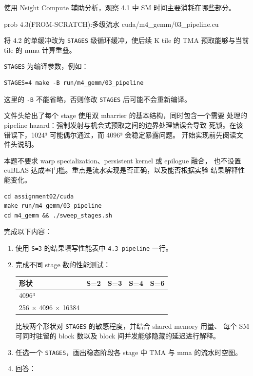 \documentclass[11pt,a4paper,fontset=none]{ctexart}
\providecommand{\passthrough}[1]{#1}
\begin{document}
使用 Nsight Compute 辅助分析，观察 4.1 中 SM 时间主要消耗在哪些部分。

\begin{capstone}{prob 4.3(FROM-SCRATCH):多级流水 \hfill {\footnotesize\ttfamily cuda/m4\_gemm/03\_pipeline.cu}}

将 4.2 的单缓冲改为 \passthrough{\lstinline!STAGES!} 级循环缓冲，使后续
K tile 的 TMA 预取能够与当前 tile 的 mma 计算重叠。

\passthrough{\lstinline!STAGES!} 为编译参数，例如：

\begin{lstlisting}
STAGES=4 make -B run/m4_gemm/03_pipeline
\end{lstlisting}

这里的 \passthrough{\lstinline!-B!} 不能省略，否则修改
\passthrough{\lstinline!STAGES!} 后可能不会重新编译。

文件头给出了每个 stage 使用双 mbarrier 的基本结构，同时包含一个需要
处理的 pipeline hazard：强制发射与机会式预取之间的边界处理错误会导致
死锁。在该错误下，1024³ 可能偶尔通过，而 4096³ 会稳定暴露问题。
开始实现前先阅读文件头说明。

本题不要求 warp specialization、persistent kernel 或 epilogue 融合，
也不设置 cuBLAS 达成率门槛。重点是流水实现是否正确，以及能否根据实验
结果解释性能变化。

\begin{lstlisting}
cd assignment02/cuda
make run/m4_gemm/03_pipeline
cd m4_gemm && ./sweep_stages.sh
\end{lstlisting}

完成以下内容：

\begin{enumerate}
\def\labelenumi{\arabic{enumi}.}
\item
  使用 \passthrough{\lstinline!S=3!} 的结果填写性能表中
  \passthrough{\lstinline!4.3 pipeline!} 一行。
\item
  完成不同 stage 数的性能测试：

  \begin{longtable}[]{@{}lllll@{}}
  \toprule\noalign{}
  形状 & S=2 & S=3 & S=4 & S=6 \\
  \midrule\noalign{}
  \endhead
  \bottomrule\noalign{}
  \endlastfoot
  4096³ & & & & \\
  256 × 4096 × 16384 & & & & \\
  \end{longtable}

  比较两个形状对 \passthrough{\lstinline!STAGES!} 的敏感程度，并结合
  shared memory 用量、 每个 SM 可同时驻留的 block 数以及 block
  间并发能够隐藏的延迟进行解释。
\item
  任选一个 \passthrough{\lstinline!STAGES!}，画出稳态阶段各 stage 中 TMA
  与 mma 的流水时空图。
\item
  回答：


\end{enumerate}
\end{capstone}
\end{document}
